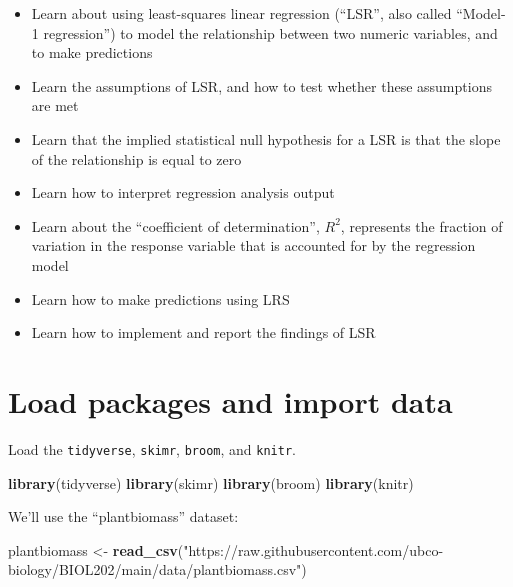\documentclass[
]{book}
\newenvironment{Shaded}{\begin{snugshade}}{\end{snugshade}}
\newcommand{\FunctionTok}[1]{\textcolor[rgb]{0.13,0.29,0.53}{\textbf{#1}}}
\newcommand{\NormalTok}[1]{#1}
\newcommand{\OtherTok}[1]{\textcolor[rgb]{0.56,0.35,0.01}{#1}}
\newcommand{\StringTok}[1]{\textcolor[rgb]{0.31,0.60,0.02}{#1}}
\providecommand{\tightlist}{%
  \setlength{\itemsep}{0pt}\setlength{\parskip}{0pt}}
\begin{document}
\begin{itemize}
\tightlist
\item
  Learn about using least-squares linear regression (``LSR'', also called ``Model-1 regression'') to model the relationship between two numeric variables, and to make predictions\\
\item
  Learn the assumptions of LSR, and how to test whether these assumptions are met
\item
  Learn that the implied statistical null hypothesis for a LSR is that the slope of the relationship is equal to zero
\item
  Learn how to interpret regression analysis output
\item
  Learn about the ``coefficient of determination'', \(R^2\), represents the fraction of variation in the response variable that is accounted for by the regression model
\item
  Learn how to make predictions using LRS
\item
  Learn how to implement and report the findings of LSR
\end{itemize}

\section{Load packages and import data}\label{LSR_packages_data}

Load the \texttt{tidyverse}, \texttt{skimr}, \texttt{broom}, and \texttt{knitr}.

\begin{Shaded}
\begin{Highlighting}[]
\FunctionTok{library}\NormalTok{(tidyverse)}
\FunctionTok{library}\NormalTok{(skimr)}
\FunctionTok{library}\NormalTok{(broom)}
\FunctionTok{library}\NormalTok{(knitr)}
\end{Highlighting}
\end{Shaded}

We'll use the ``plantbiomass'' dataset:

\begin{Shaded}
\begin{Highlighting}[]
\NormalTok{plantbiomass }\OtherTok{\textless{}{-}} \FunctionTok{read\_csv}\NormalTok{(}\StringTok{"https://raw.githubusercontent.com/ubco{-}biology/BIOL202/main/data/plantbiomass.csv"}\NormalTok{)}
\end{Highlighting}
\end{Shaded}
\end{document}
